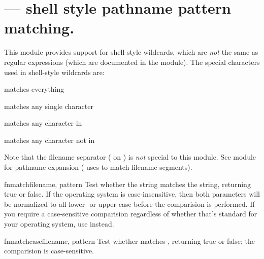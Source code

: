\section{ ---
         \UNIX{} shell style pathname pattern matching.}



This module provides support for \UNIX{} shell-style wildcards, which
are \emph{not} the same as regular expressions (which are documented
in the  module).  The special characters
used in shell-style wildcards are:

\begin{list}{}{\leftmargin 0.5in }
\item[\code{*}] matches everything
\item[\code{?}]	matches any single character
\item[\code{[}\var{seq}\code{]}] matches any character in 
\item[\code{[!}\var{seq}\code{]}] matches any character not in 
\end{list}

Note that the filename separator ( on \UNIX{}) is \emph{not}
special to this module.  See module 
for pathname expansion ( uses  to
match filename segments).


\begin{funcdesc}{fnmatch}{filename, pattern}
Test whether the  string matches the 
string, returning true or false.  If the operating system is
case-insensitive, then both parameters will be normalized to all
lower- or upper-case before the comparision is performed.  If you
require a case-sensitive comparision regardless of whether that's
standard for your operating system, use 
instead.
\end{funcdesc}

\begin{funcdesc}{fnmatchcase}{filename, pattern}
Test whether  matches , returning true or
false; the comparision is case-sensitive.
\end{funcdesc}

\begin{seealso}
\end{seealso}
